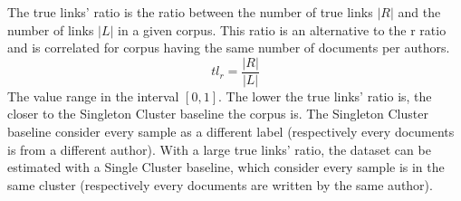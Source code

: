 \begin{definition}
  The true links' ratio is the ratio between the number of true links $|R|$ and the number of links $|L|$ in a given corpus.
  This ratio is an alternative to the r ratio and is correlated for corpus having the same number of documents per authors.
  \begin{equation}
    tl_r = \frac{|R|}{|L|}
  \end{equation}
  The value range in the interval $\left[0, 1\right]$.
  The lower the true links' ratio is, the closer to the Singleton Cluster baseline the corpus is.
  The Singleton Cluster baseline consider every sample as a different label (respectively every documents is from a different author).
  With a large true links' ratio, the dataset can be estimated with a Single Cluster baseline, which consider every sample is in the same cluster (respectively every documents are written by the same author).
\end{definition}
